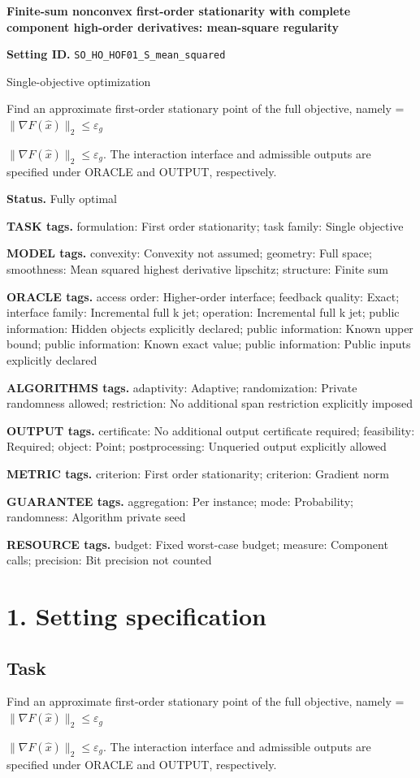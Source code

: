 \documentclass[10pt,a4paper]{article}
\newcommand{\AtlasMath}[1]{\par\begingroup\centering\setbox0=\hbox{$\displaystyle #1$}\ifdim\wd0>1.4\linewidth\typeout{ATLAS WIDE FORMULA: \the\wd0}\fi\ifdim\wd0>\linewidth\resizebox{\linewidth}{!}{\box0}\else\box0\fi\par\endgroup}
\newcommand{\AtlasInlineMath}[1]{\begingroup\setbox0=\hbox{$#1$}\ifdim\wd0>.4\linewidth\endgroup\AtlasMath{#1}\else\endgroup$#1$\fi}
\begin{document}
\raggedright

{\LARGE\bfseries\sffamily\color{AtlasNavy} Finite-sum nonconvex first-order stationarity with complete component high-order derivatives: mean-square regularity\par}\vspace{5pt}
\textbf{Setting ID.} \texttt{SO\_\allowbreak{}HO\_\allowbreak{}HOF01\_\allowbreak{}S\_\allowbreak{}mean\_\allowbreak{}squared}

Single-objective optimization

Find an approximate first-order stationary point of the full objective, namely \AtlasInlineMath{\|\nabla F(\widehat{x})\|_2\le\varepsilon_g}. The interaction interface and admissible outputs are specified under ORACLE and OUTPUT, respectively.

\textbf{Status.} Fully optimal

\textbf{TASK tags.} formulation: First order stationarity; task family: Single objective

\textbf{MODEL tags.} convexity: Convexity not assumed; geometry: Full space; smoothness: Mean squared highest derivative lipschitz; structure: Finite sum

\textbf{ORACLE tags.} access order: Higher-order interface; feedback quality: Exact; interface family: Incremental full k jet; operation: Incremental full k jet; public information: Hidden objects explicitly declared; public information: Known upper bound; public information: Known exact value; public information: Public inputs explicitly declared

\textbf{ALGORITHMS tags.} adaptivity: Adaptive; randomization: Private randomness allowed; restriction: No additional span restriction explicitly imposed

\textbf{OUTPUT tags.} certificate: No additional output certificate required; feasibility: Required; object: Point; postprocessing: Unqueried output explicitly allowed

\textbf{METRIC tags.} criterion: First order stationarity; criterion: Gradient norm

\textbf{GUARANTEE tags.} aggregation: Per instance; mode: Probability; randomness: Algorithm private seed

\textbf{RESOURCE tags.} budget: Fixed worst-case budget; measure: Component calls; precision: Bit precision not counted

\section{1. Setting specification}
\subsection{Task}
Find an approximate first-order stationary point of the full objective, namely \AtlasInlineMath{\|\nabla F(\widehat{x})\|_2\le\varepsilon_g}. The interaction interface and admissible outputs are specified under ORACLE and OUTPUT, respectively.
\end{document}

